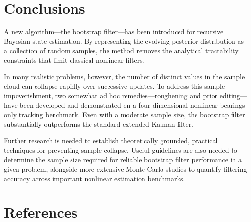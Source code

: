 \section{Conclusions}\label{sec:conc}

A new algorithm—the bootstrap filter—has been introduced for recursive Bayesian state estimation. By representing the evolving posterior distribution as a collection of random samples, the method removes the analytical tractability constraints that limit classical nonlinear filters.

In many realistic problems, however, the number of distinct values in the sample cloud can collapse rapidly over successive updates. To address this sample impoverishment, two somewhat ad hoc remedies—roughening and prior editing—have been developed and demonstrated on a four-dimensional nonlinear bearings-only tracking benchmark. Even with a moderate sample size, the bootstrap filter substantially outperforms the standard extended Kalman filter.

Further research is needed to establish theoretically grounded, practical techniques for preventing sample collapse. Useful guidelines are also needed to determine the sample size required for reliable bootstrap filter performance in a given problem, alongside more extensive Monte Carlo studies to quantify filtering accuracy across important nonlinear estimation benchmarks.

\section{References}\label{sec:refs}




